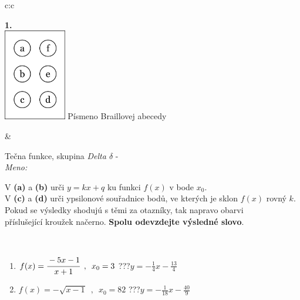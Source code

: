 \documentclass[10pt]{report}
\begin{document}
\begin{tabular}{c:c}
\begin{minipage}[c][104.5mm][t]{0.5\linewidth}
\begin{center}
\begin{minipage}{0.20\linewidth}
\begin{center}
{\Huge\bfseries 1.} \\[2mm]
\includegraphics[height=40mm]{../images/braille.png}
{\small Písmeno Braillovej abecedy}
\end{center}
\end{minipage}
\end{center}
\end{minipage}
&
\begin{minipage}[c][104.5mm][t]{0.5\linewidth}
\begin{center}
\vspace{7mm}
{\huge Tečna funkce, skupina \textit{Delta $\delta$} -}\\[5mm]
\textit{Meno:}\phantom{xxxxxxxxxxxxxxxxxxxxxxxxxxxxxxxxxxxxxxxxxxxxxxxxxxxxxxxxxxxxxxxxx}\\[5mm]
\begin{minipage}{0.95\linewidth}
\begin{center}
V \textbf{(a)} a \textbf{(b)} urči  $y = kx + q$ ku funkci $f(x)$ v bode $x_0$.\\V \textbf{(c)} a \textbf{(d)} urči ypsilonové souřadnice bodů, ve kterých je sklon $f(x)$ rovný $k$.\\Pokud se výsledky shodujú s těmi za otazníky, tak napravo obarvi\\příslušející kroužek načerno. \textbf{Spolu odevzdejte výsledné slovo}.
\end{center}
\end{minipage}
\\[1mm]
\begin{minipage}{0.79\linewidth}
\begin{center}
\begin{varwidth}{\linewidth}
\begin{enumerate}
\small
\item $f(x)=\cfrac{-5x-1}{x+1}\enspace , \enspace x_0=3$\quad \dotfill\; ???\;\dotfill \quad $y = -\frac{1}{4}x-\frac{13}{4}$
\item $f(x)=-\sqrt{x-1}\enspace , \enspace x_0=82$\quad \dotfill\; ???\;\dotfill \quad $y = -\frac{1}{18}x-\frac{40}{9}$

\end{enumerate}
\end{varwidth}
\end{center}
\end{minipage}
\end{center}
\end{minipage}
\end{tabular}
\end{document}
